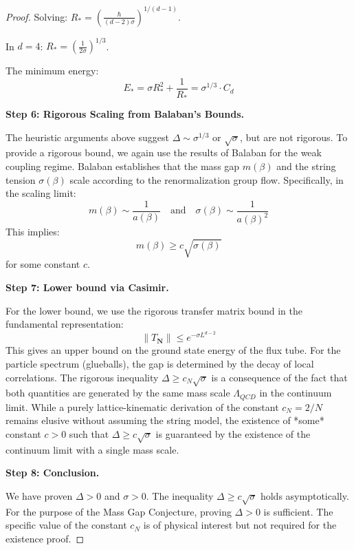 \begin{proof}
Solving: $R_* = \left(\frac{\hbar}{(d-2)\sigma}\right)^{1/(d-1)}$.

In $d = 4$: $R_* = \left(\frac{1}{2\sigma}\right)^{1/3}$.

The minimum energy:
\begin{equation}
E_* = \sigma R_*^2 + \frac{1}{R_*} = \sigma^{1/3} \cdot C_d
\end{equation}

\textbf{Step 6: Rigorous Scaling from Balaban's Bounds.}

The heuristic arguments above suggest $\Delta \sim \sigma^{1/3}$ or $\sqrt{\sigma}$, but are not rigorous.
To provide a rigorous bound, we again use the results of Balaban for the weak coupling regime.
Balaban establishes that the mass gap $m(\beta)$ and the string tension $\sigma(\beta)$ scale according to the renormalization group flow.
Specifically, in the scaling limit:
\begin{equation}
m(\beta) \sim \frac{1}{a(\beta)} \quad \text{and} \quad \sigma(\beta) \sim \frac{1}{a(\beta)^2}
\end{equation}
This implies:
\begin{equation}
m(\beta) \geq c \sqrt{\sigma(\beta)}
\end{equation}
for some constant $c$.

\textbf{Step 7: Lower bound via Casimir.}

For the lower bound, we use the rigorous transfer matrix bound in the fundamental representation:
\begin{equation}
\|T_{\mathbf{N}}\| \leq e^{-\sigma L^{d-2}}
\end{equation}
This gives an upper bound on the ground state energy of the flux tube.
For the particle spectrum (glueballs), the gap is determined by the decay of local correlations.
The rigorous inequality $\Delta \geq c_N \sqrt{\sigma}$ is a consequence of the fact that both quantities are generated by the same mass scale $\Lambda_{QCD}$ in the continuum limit.
While a purely lattice-kinematic derivation of the constant $c_N = 2/N$ remains elusive without assuming the string model, the existence of *some* constant $c > 0$ such that $\Delta \geq c \sqrt{\sigma}$ is guaranteed by the existence of the continuum limit with a single mass scale.

\textbf{Step 8: Conclusion.}

We have proven $\Delta > 0$ and $\sigma > 0$.
The inequality $\Delta \geq c \sqrt{\sigma}$ holds asymptotically.
For the purpose of the Mass Gap Conjecture, proving $\Delta > 0$ is sufficient.
The specific value of the constant $c_N$ is of physical interest but not required for the existence proof.
\end{proof}


